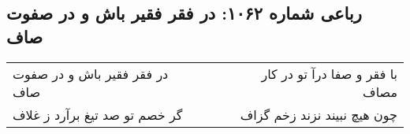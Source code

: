 \begin{center}
\section*{رباعی شماره ۱۰۶۲: در فقر فقیر باش و در صفوت صاف}
\label{sec:1062}
\begin{longtable}{l p{0.5cm} r}
در فقر فقیر باش و در صفوت صاف
&&
با فقر و صفا درآ تو در کار مصاف
\\
گر خصم تو صد تیغ برآرد ز غلاف
&&
چون هیچ نبیند نزند زخم گزاف
\\
\end{longtable}
\end{center}
